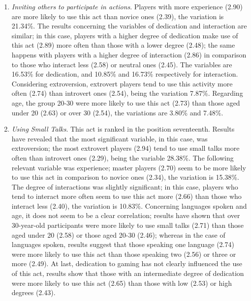 \documentclass[english]{textolivre}
\begin{document}
\begin{enumerate}
\item \emph{Inviting others to participate in actions}. Players with more experience (2.90) are more likely to use this act than novice ones (2.39), the variation is 21.34\%. The results concerning the variables of dedication and interaction are similar; in this case, players with a higher degree of dedication make use of this act (2.89) more often than those with a lower degree (2.48); the same happens with players with a higher degree of interaction (2.86) in comparison to those who interact less (2.58) or neutral ones (2.45). The variables are 16.53\% for dedication, and 10.85\% and 16.73\% respectively for interaction. Considering extroversion, extrovert players tend to use this activity more often (2.74) than introvert ones (2.54), being the variation 7.87\%. Regarding age, the group 20-30 were more likely to use this act (2.73) than those aged under 20 (2.63) or over 30 (2.54), the variations are 3.80\% and 7.48\%. 
\item \emph{Using Small Talks}. This act is ranked in the position seventeenth. Results have revealed that the most significant variable, in this case, was extroversion; the most extrovert players (2.94) tend to use small talks more often than introvert ones (2.29), being the variable 28.38\%. The following relevant variable was experience; master players (2.70) seem to be more likely to use this act in comparison to novice ones (2.34), the variation is 15.38\%. The degree of interactions was slightly significant; in this case, players who tend to interact more often seem to use this act more (2.66) than those who interact less (2.40), the variation is 10.83\%. Concerning languages spoken and age, it does not seem to be a clear correlation; results have shown that over 30-year-old participants were more likely to use small talks (2.71) than those aged under 20 (2.58) or those aged 20-30 (2.46); whereas in the case of languages spoken, results suggest that those speaking one language (2.74) were more likely to use this act than those speaking two (2.56) or three or more (2.49). At last, dedication to gaming has not clearly influenced the use of this act, results show that those with an intermediate degree of dedication were more likely to use this act (2.65) than those with low (2.53) or high degrees (2.43).

\end{enumerate}
\end{document}
